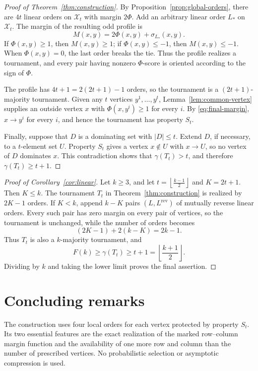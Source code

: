 \documentclass[12pt]{article}
\theoremstyle{remark}
\newcommand{\rev}{\mathrm{rev}}
\newcommand{\cX}{\mathcal{X}}
\newcommand{\margin}{M}
\begin{document}
\begin{proof}[Proof of Theorem~\ref{thm:construction}]
By Proposition~\ref{prop:global-orders}, there are $4t$ linear orders
on $\cX_t$ with margin $2\Phi$.  Add an arbitrary linear order $L_*$ on
$\cX_t$.  The margin of the resulting odd profile is
\begin{equation}\label{eq:final-margin}
  \margin(x,y)=2\Phi(x,y)+\sigma_{L_*}(x,y).
\end{equation}
If $\Phi(x,y)\ge1$, then $\margin(x,y)\ge1$; if $\Phi(x,y)\le-1$, then
$\margin(x,y)\le-1$.  When $\Phi(x,y)=0$, the last order breaks the
tie.  Thus the profile realizes a tournament, and every pair having
nonzero $\Phi$-score is oriented according to the sign of $\Phi$.

The profile has $4t+1=2(2t+1)-1$ orders, so the tournament is a $(2t+1)$-majority tournament.  Given any
$t$ vertices $y^1,\ldots,y^t$, Lemma~\ref{lem:common-vertex} supplies
an outside vertex $x$ with $\Phi(x,y^i)\ge1$ for every $i$.  By
\eqref{eq:final-margin}, $x\to y^i$ for every $i$, and hence the
tournament has property $S_t$.

Finally, suppose that $D$ is a dominating set with $|D|\le t$.  Extend
$D$, if necessary, to a $t$-element set $U$.  Property $S_t$ gives a
vertex $x\notin U$ with $x\to U$, so no vertex of $D$ dominates $x$.
This contradiction shows that $\gamma(T_t)>t$, and therefore
$\gamma(T_t)\ge t+1$.
\end{proof}

\begin{proof}[Proof of Corollary~\ref{cor:linear}]
Let $k\ge3$, and let
$t=\left\lfloor\frac{k-1}{2}\right\rfloor$ and 
 $K=2t+1$.
Then $K\le k$.  The tournament $T_t$ in Theorem~\ref{thm:construction}
is realized by $2K-1$ orders.  If $K<k$, append $k-K$ pairs
$(L,L^{\rev})$ of mutually reverse linear orders.  Every such pair has
zero margin on every pair of vertices, so the tournament is unchanged,
while the number of orders becomes
\[
  (2K-1)+2(k-K)=2k-1.
\]
Thus $T_t$ is also a $k$-majority tournament, and
\[
  F(k)\ge\gamma(T_t)\ge t+1
  =\left\lfloor\frac{k+1}{2}\right\rfloor.
\]
Dividing by $k$ and taking the lower limit proves the final assertion.
\end{proof}

\section{Concluding remarks}

The construction uses four local orders for each vertex protected by
property $S_t$.  Its two essential features are the exact realization
of the marked row--column margin function and the availability of one
more row and column than the number of prescribed vertices.  No probabilistic
selection or asymptotic compression is used.
\end{document}
